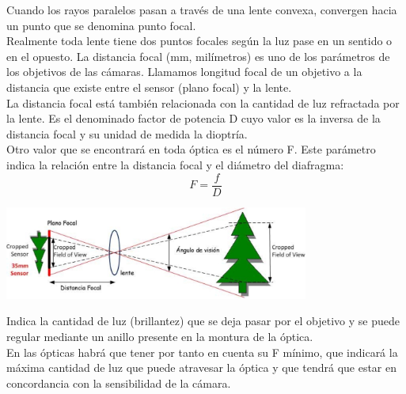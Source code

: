 Cuando los rayos paralelos pasan a través de una lente convexa, convergen
hacia un punto que se denomina punto focal.\\
Realmente toda lente tiene dos puntos focales según la luz pase en un sentido o
en el opuesto. La distancia focal (mm, milímetros) es uno de los parámetros de los
objetivos de las cámaras. Llamamos longitud  focal de un objetivo a la distancia que
existe entre el sensor (plano focal) y la lente.\\
La distancia focal está también relacionada con la cantidad de luz
refractada por la lente. Es el denominado factor de potencia D cuyo valor es la inversa
de la distancia focal y su unidad de medida la dioptría.\\
Otro valor que se encontrará en toda óptica es el número F. Este parámetro
indica la relación entre la distancia focal y el diámetro del diafragma:
\begin{equation}
	F = \frac{f}{D}
\end{equation}
\begin{center}
	\includegraphics[width=0.75\textwidth]{Contenido/Cuerpo/Capitulo2/Fig1_4.eps}
	\label{fig:MarcoTeorico:Fig6}
\end{center}
Indica la cantidad de luz (brillantez) que se deja pasar por el objetivo y se puede regular
mediante un anillo presente en la montura de la óptica.\\
En las ópticas habrá que tener por
tanto en cuenta su F mínimo, que indicará la máxima cantidad de luz que puede
atravesar la óptica y que tendrá que estar en concordancia con la sensibilidad de la
cámara.

